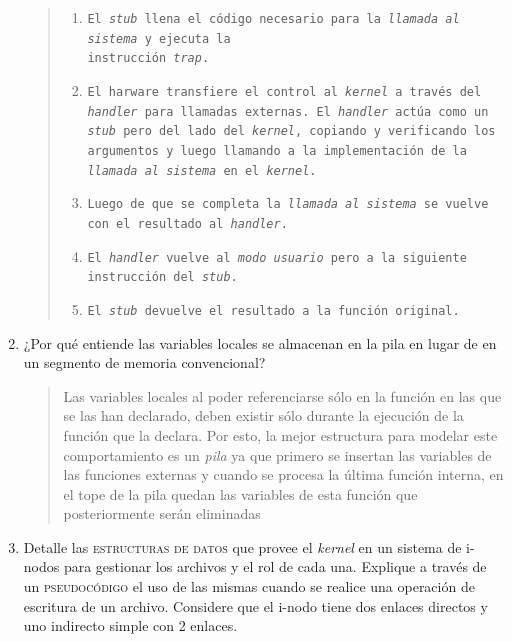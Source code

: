 \documentclass[a4paper,10pt,spanish]{article}
\begin{document}
\begin{enumerate}[1.]
\begin{quote}
\begin{enumerate}[1.]
\item \texttt{El \textit{stub} llena el código necesario para la \textit{llamada al sistema} y ejecuta la \\ instrucción \textit{trap}.}

\item \texttt{El harware transfiere el control al \textit{kernel} a través del \textit{handler} para llamadas externas. El \textit{handler} actúa como un \textit{stub} pero del lado del \textit{kernel}, copiando y verificando los argumentos y luego llamando a la implementación de la \textit{llamada al sistema} en el \textit{kernel}.}

\item \texttt{Luego de que se completa la \textit{llamada al sistema} se vuelve con el resultado al \textit{handler}.}

\item \texttt{El \textit{handler} vuelve al \textit{modo usuario} pero a la siguiente instrucción del \textit{stub}.}

\item \texttt{El \textit{stub} devuelve el resultado a la función original.}
\end{enumerate}

\end{quote}

\item ¿Por qué entiende las variables locales se almacenan en la pila en lugar de en un segmento de memoria convencional?

\begin{quote}
Las variables locales al poder referenciarse sólo en la función en las que se las han declarado, deben existir sólo durante la ejecución de la función que la declara. Por esto, la mejor estructura para modelar este comportamiento es un \textit{pila} ya que primero se insertan las variables de las funciones externas y cuando se procesa la última función interna, en el tope de la pila quedan las variables de esta función que posteriormente serán eliminadas
\end{quote}

\item Detalle las \textsc{estructuras de datos} que provee el \textit{kernel} en un sistema de i-nodos para gestionar los archivos y el rol de cada una. Explique a través de un \textsc{pseudocódigo} el uso de las mismas cuando se realice una operación de escritura de un archivo. Considere que el i-nodo tiene dos enlaces directos y uno indirecto simple con 2 enlaces.


\end{enumerate}
\end{document}
